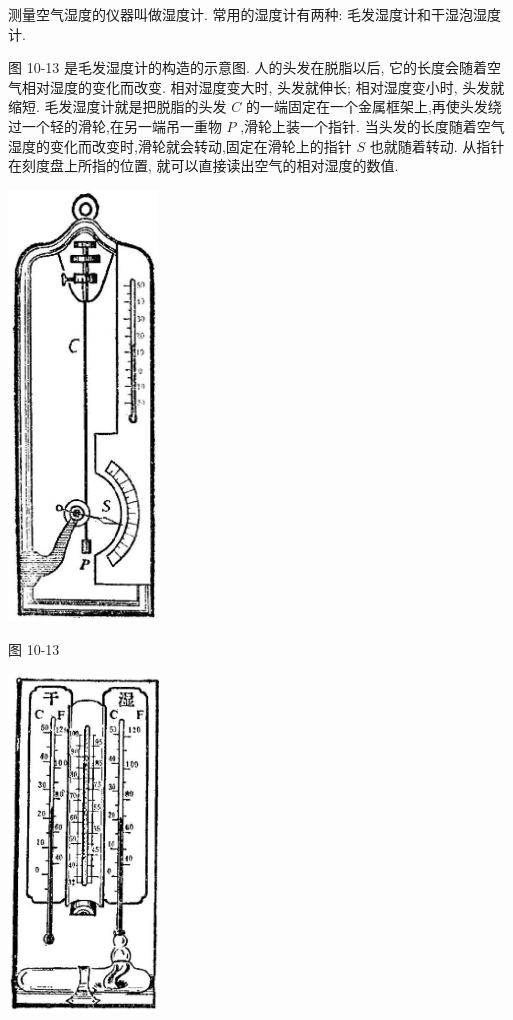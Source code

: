 \documentclass[10pt]{article}
\begin{document}
测量空气湿度的仪器叫做湿度计. 常用的湿度计有两种: 毛发湿度计和干湿泡湿度计.

图 10-13 是毛发湿度计的构造的示意图. 人的头发在脱脂以后, 它的长度会随着空气相对湿度的变化而改变. 相对湿度变大时, 头发就伸长; 相对湿度变小时, 头发就缩短. 毛发湿度计就是把脱脂的头发 \(C\) 的一端固定在一个金属框架上,再使头发绕过一个轻的滑轮,在另一端吊一重物 \(P\) ,滑轮上装一个指针. 当头发的长度随着空气湿度的变化而改变时,滑轮就会转动,固定在滑轮上的指针 \(S\) 也就随着转动. 从指针在刻度盘上所指的位置, 就可以直接读出空气的相对湿度的数值.

\begin{center}
\includegraphics[max width=0.3\textwidth]{images/01912d55-147c-70aa-b0e0-1782a122f948_310_601833.jpg}
\end{center}

图 10-13

\begin{center}
\includegraphics[max width=0.3\textwidth]{images/01912d55-147c-70aa-b0e0-1782a122f948_310_725243.jpg}
\end{center}
\end{document}
